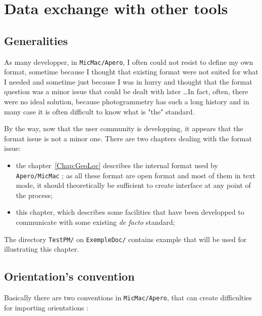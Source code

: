 \chapter{Data exchange with other tools}

\section{Generalities}

As many developper, in {\tt MicMac/Apero}, I often could not resist to 
define my own format, sometime because I thought that existing 
format were not suited for what I needed and sometime just because I was in
hurry and thought that the format question was a minor issue that could be
dealt with later \dots In fact, often, there were no ideal solution, because 
photogrammetry has such a long history and in many case it is often difficult to
know what is "the" standard.

\vspace{\baselineskip}
By the way, now that the user community is developping, it appears that the format issue
is not a minor one. There are two chapters dealing with the format issue:

\begin{itemize}
   \item  the chapter~\ref{Chap:GeoLoc} describes the internal format used
          by {\tt Apero/MicMac} ; as all these
          format are open format and most of them in text mode, it should theoretically be sufficient
          to create interface at any point of the process;

   \item  this chapter, which describes some facilities that have been developped to communicate
          with some existing \emph{de facto} standard;
\end{itemize}

The directory {\tt TestPM/} on {\tt ExempleDoc/} contains example that will be used for
illustrating this chapter.


\section{Orientation's convention}

Basically there are two conventions in {\tt MicMac/Apero}, that can create
difficulties for importing orientations :

